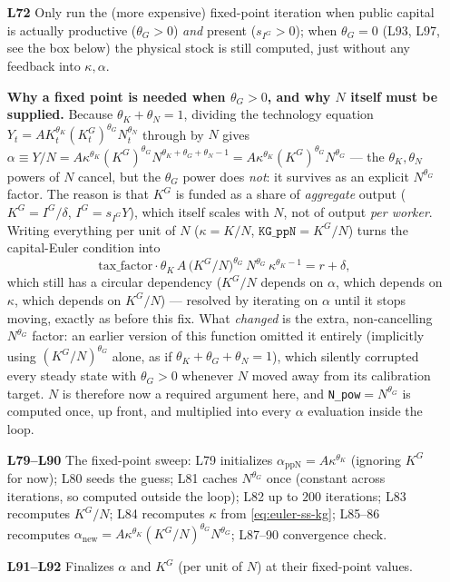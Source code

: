 \documentclass[11pt]{article}
\newcommand{\eq}[1]{\begin{equation}#1\end{equation}}
\begin{document}
\begin{itemize}
\item[\textbf{L72}] Only run the (more expensive) fixed-point iteration when
public capital is actually productive ($\theta_G>0$) \emph{and} present
($s_{I^G}>0$); when $\theta_G=0$ (L93, L97, see the box below) the physical
stock is still computed, just without any feedback into $\kappa,\alpha$.
\item[\textbf{Why a fixed point is needed when $\theta_G>0$, and why $N$
itself must be supplied.}] Because $\theta_K+\theta_N=1$, dividing the
technology equation $Y_t=AK_t^{\theta_K}(K^G_t)^{\theta_G}N_t^{\theta_N}$
through by $N$ gives $\alpha\equiv Y/N=A\kappa^{\theta_K}(K^G)^{\theta_G}
N^{\theta_K+\theta_G+\theta_N-1}=A\kappa^{\theta_K}(K^G)^{\theta_G}N^{\theta_G}$
--- the $\theta_K,\theta_N$ powers of $N$ cancel, but the $\theta_G$ power
does \emph{not}: it survives as an explicit $N^{\theta_G}$ factor. The
reason is that $K^G$ is funded as a share of \emph{aggregate} output
($K^G=I^G/\delta$, $I^G=s_{I^G}Y$), which itself scales with $N$, not of
output \emph{per worker}. Writing everything per unit of $N$
($\kappa=K/N$, $\texttt{KG\_ppN}=K^G/N$) turns the capital-Euler condition
into
\eq{ \text{tax\_factor}\cdot\theta_K\,A\,\big(K^G/N\big)^{\theta_G}\,N^{\theta_G}\,\kappa^{\theta_K-1} = r+\delta, \label{eq:euler-ss-kg}}
which still has a circular dependency ($K^G/N$ depends on $\alpha$, which
depends on $\kappa$, which depends on $K^G/N$) --- resolved by iterating on
$\alpha$ until it stops moving, exactly as before this fix. What
\emph{changed} is the extra, non-cancelling $N^{\theta_G}$ factor: an
earlier version of this function omitted it entirely (implicitly using
$(K^G/N)^{\theta_G}$ alone, as if $\theta_K+\theta_G+\theta_N=1$), which
silently corrupted every steady state with $\theta_G>0$ whenever $N$ moved
away from its calibration target. $N$ is therefore now a required argument
here, and \texttt{N\_pow}$=N^{\theta_G}$ is computed once, up front, and
multiplied into every $\alpha$ evaluation inside the loop.
\item[\textbf{L79--L90}] The fixed-point sweep: L79 initializes
$\alpha_{\text{ppN}}=A\kappa^{\theta_K}$ (ignoring $K^G$ for now); L80 seeds
the guess; L81 caches $N^{\theta_G}$ once (constant across iterations, so
computed outside the loop); L82 up to $200$ iterations; L83 recomputes
$K^G/N$; L84 recomputes $\kappa$ from \eqref{eq:euler-ss-kg}; L85--86
recomputes $\alpha_{\text{new}}=A\kappa^{\theta_K}(K^G/N)^{\theta_G}N^{\theta_G}$;
L87--90 convergence check.
\item[\textbf{L91--L92}] Finalizes $\alpha$ and $K^G$ (per unit of $N$) at
their fixed-point values.
\end{itemize}
\end{document}
